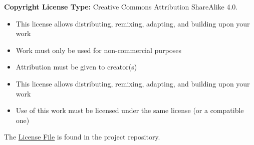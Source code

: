 \textbf{Copyright License Type:} Creative Commons Attribution ShareAlike 4.0.
\begin{itemize}
	\item This license allows distributing, remixing, adapting, and building upon your work
	\item Work must only be used for non-commercial purposes
	\item Attribution must be given to creator(s)
	\item This license allows distributing, remixing, adapting, and building upon your work
	\item Use of this work must be licensed under the same license (or a compatible one)
\end{itemize}

\noindent The \href{https://github.com/Aeolus-Software/RealmForge/blob/main/LICENSE}{License File} is found in the project repository.



